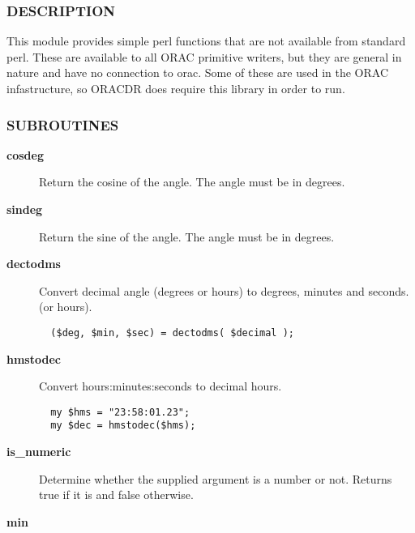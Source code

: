 \begin{description}
\begin{description}
\subsubsection*{DESCRIPTION\label{ORAC::General_DESCRIPTION}}


This module provides simple perl functions that are not available
from standard perl. These are available to all ORAC primitive writers,
but they are general in nature and have no connection to orac. Some of
these are used in the ORAC infastructure, so ORACDR does require this
library in order to run.

\subsubsection*{SUBROUTINES\label{ORAC::General_SUBROUTINES}}
\begin{description}

\item[{\textbf{cosdeg}}] \mbox{}

Return the cosine of the angle. The angle must be in degrees.


\item[{\textbf{sindeg}}] \mbox{}

Return the sine of the angle. The angle must be in degrees.


\item[{\textbf{dectodms}}] \mbox{}

Convert decimal angle (degrees or hours) to degrees, minutes and seconds.
(or hours).

\begin{verbatim}
  ($deg, $min, $sec) = dectodms( $decimal );
\end{verbatim}

\item[{\textbf{hmstodec}}] \mbox{}

Convert hours:minutes:seconds to decimal hours.

\begin{verbatim}
  my $hms = "23:58:01.23";
  my $dec = hmstodec($hms);
\end{verbatim}

\item[{\textbf{is\_numeric}}] \mbox{}

Determine whether the supplied argument is a number or not.
Returns true if it is and false otherwise.


\item[{\textbf{min}}] \mbox{}


\end{description}
\end{description}
\end{description}

